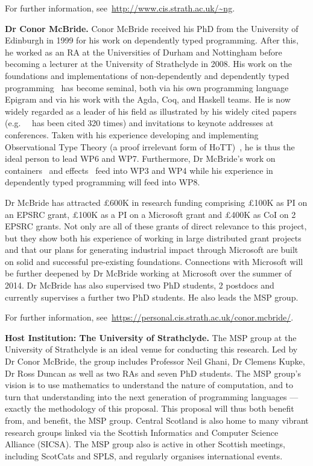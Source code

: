 \documentclass[a4paper,11pt]{article}
\newcommand{\eg}{{e.g.}\ }
\begin{document}
For further information, see~\url{http://www.cis.strath.ac.uk/~ng}.

\textbf{Dr Conor McBride.} Conor McBride received his PhD from the
University of Edinburgh in 1999 for his work on dependently typed
programming. After this, he worked as an RA at the Universities of
Durham and Nottingham before becoming a lecturer at the University of
Strathclyde in 2008. His work on the foundations and implementations
of non-dependently and dependently typed
programming~\cite{viewftl,alti:ott-conf,easy}
has become seminal, both via his own programming language
Epigram and via his work with the Agda, Coq, and Haskell teams. He is
now widely regarded as a leader of his field as illustrated by his
widely cited papers (\eg ~\cite{viewftl} has been cited 320 times) and
invitations to keynote addresses at conferences. Taken with his
experience developing and implementing Observational Type Theory (a
proof irrelevant form of HoTT)~\cite{alti:ott-conf}, he is
thus the ideal person to lead WP6 and WP7. Furthermore, Dr McBride's
work on containers~\cite{alti:mpc04}
and effects~\cite{conor:frank} feed into WP3 and WP4 while his experience
in dependently typed programming will feed into WP8.

Dr McBride has attracted \pounds 600K in research funding comprising
\pounds 100K as PI on an EPSRC grant, \pounds 100K as a PI on a
Microsoft grant and \pounds 400K as CoI on 2 EPSRC grants. Not only
are all of these grants of direct relevance to this project, but they
show both his experience of working in large distributed grant
projects and that our plans for generating industrial impact through
Microsoft are built on solid and successful pre-existing
foundations. Connections with Microsoft will be further deepened by Dr
McBride working at Microsoft over the summer of 2014.  Dr McBride has
also supervised two PhD students, 2 postdocs and currently supervises
a further two PhD students. He also leads the MSP group.

For further information,
see~\url{https://personal.cis.strath.ac.uk/conor.mcbride/}.

\textbf{Host Institution: The University of Strathclyde.} The MSP
group at the University of Strathclyde is an ideal venue for
conducting this research. Led by Dr Conor McBride, the group includes
Professor Neil Ghani, Dr Clemens Kupke, Dr Ross Duncan as well as two RAs and seven PhD students. The MSP group's vision is to use
mathematics to understand the nature of computation, and to turn that
understanding into the next generation of programming languages ---
exactly the methodology of this proposal. This proposal will thus both
benefit from, and benefit, the MSP group. Central Scotland
is also home to many vibrant research groups linked via  the Scottish
Informatics and Computer Science Alliance (SICSA). The MSP group also
is active in other Scottish meetings, including ScotCats and SPLS, and
regularly organises international events.
\end{document}
